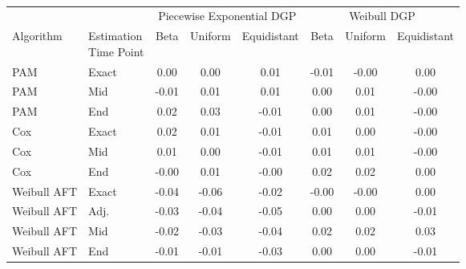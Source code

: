 \begin{table*}[htbp]
\centering
\caption{\captionicfebias}
\label{tab:sim-ic-fe-bias}
\begin{sideways}
\begin{tabular}{llcccccc}
\toprule
& & \multicolumn{3}{c}{Piecewise Exponential DGP} & \multicolumn{3}{c}{Weibull DGP} \\
\cmidrule(lr){3-5} \cmidrule(lr){6-8}
Algorithm & \shortstack[l]{Estimation \\ Time Point} & Beta & Uniform & Equidistant & Beta & Uniform & Equidistant \\
\midrule
PAM & Exact & 0.00 & 0.00 & 0.01 & -0.01 & -0.00 & 0.00 \\
PAM & Mid & -0.01 & 0.01 & 0.01 & 0.00 & 0.01 & -0.00 \\
PAM & End & 0.02 & 0.03 & -0.01 & 0.00 & 0.01 & -0.00 \\
\addlinespace
Cox & Exact & 0.02 & 0.01 & -0.01 & 0.01 & 0.00 & -0.00 \\
Cox & Mid & 0.01 & 0.00 & -0.01 & 0.01 & 0.01 & -0.00 \\
Cox & End & -0.00 & 0.01 & -0.00 & 0.02 & 0.02 & 0.00 \\
\addlinespace
Weibull AFT & Exact & -0.04 & -0.06 & -0.02 & -0.00 & -0.00 & 0.00 \\
Weibull AFT & Adj. & -0.03 & -0.04 & -0.05 & 0.00 & 0.00 & -0.01 \\
Weibull AFT & Mid & -0.02 & -0.03 & -0.04 & 0.02 & 0.02 & 0.03 \\
Weibull AFT & End & -0.01 & -0.01 & -0.03 & 0.00 & 0.00 & -0.01 \\
\bottomrule
\end{tabular}
\end{sideways}
\end{table*}
